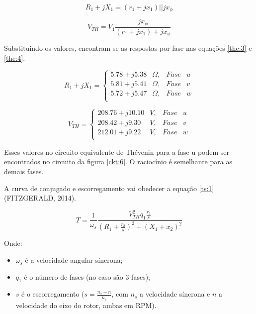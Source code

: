 \begin{equation} \label{the:1}
R_1 + jX_1 = (r_1+jx_1) || jx_{\phi}  
\end{equation}

\begin{equation} \label{the:2}
V_{TH} = V_1\frac{jx_{\phi}}{(r_1+jx_1)+jx_{\phi}}  
\end{equation}

Substituindo os valores, encontram-se as respostas por fase nas equações \ref{the:3} e \ref{the:4}.

\begin{equation} \label{the:3}
R_1+jX_1 =  
\left \{
\begin{array}{clcl}
5.78+j5.38&\Omega, & Fase&u \\
5.81+j5.41&\Omega, & Fase&v \\
5.72+j5.47&\Omega, & Fase&w \\
\end{array}
\right.
\end{equation}

\begin{equation} \label{the:4}
V_{TH}=  
\left \{
\begin{array}{clcl}
208.76+j10.10&V, & Fase&u \\
208.42+j9.30&V, & Fase&v \\
212.01+j9.22&V, & Fase&w \\
\end{array}
\right.
\end{equation}

Esses valores no circuito equivalente de Thévenin para a fase u podem ser encontrados no circuito da figura \ref{ckt:6}. O raciocínio é semelhante para as demais fases.




A curva de conjugado e escorregamento vai obedecer a equação \ref{ts:1} (FITZGERALD, 2014).

\begin{equation} \label{ts:1}
T=\frac{1}{\omega_s}\frac{V_{TH}^2q_1\frac{r_2}{s}}{\left(R_1+\frac{r_2}{s}\right)^2+(X_1+x_2)^2}
\end{equation}

Onde:
\begin{itemize}
    \item $\omega_s$ é a velocidade angular síncrona;
    \item $q_1$ é o número de fases (no caso são 3 fases);
    \item $s$ é o escorregamento ($s=\frac{n_s-n}{n_s}$, com $n_s$ a velocidade síncrona e $n$ a velocidade do eixo do rotor, ambas em RPM).
\end{itemize}
\pagebreak

